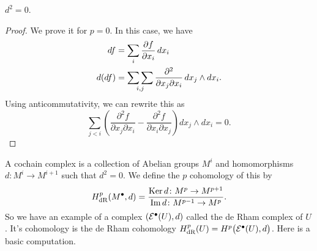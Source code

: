 \begin{lemma}
  \(d^2=0\).
\end{lemma}
\begin{proof}
  We prove it for \(p=0\). In this case, we have
  \begin{align*}
    df&=\sum_i\frac{\partial f}{\partial x_i}\mathop{}\!d x_i\\
    d(df)&=\operatorname*{\sum\sum}_{i,j}\frac{\partial^2}{\partial x_j\partial x_i}\mathop{}\!d
           x_j\wedge dx_i.
  \end{align*}
  Using anticommutativity, we can rewrite this as
  \[
    \sum_{j<i}\left(\frac{\partial^2 f}{\partial x_j\partial x_i}
    -\frac{\partial^2 f}{\partial x_i\partial x_j}\right) dx_j\wedge dx_i=0.
  \]
\end{proof}

A cochain complex is a collection of Abelian groups \(M^i\) and
homomorphisms \(d\colon M^i\to M^{i+1}\) such that \(d^2=0\). We define the
\(p\) cohomology of this by
\[
  H^p_{\mathrm{dR}}(M^\bullet,d)=\frac{\operatorname{Ker} d\colon M^p\to M^{p+1}}{\operatorname{Im} d\colon
    M^{p-1}\to M^p}.
\]
So we have an example of a complex \((\mathcal{E}^\bullet(U),d)\) called the de
Rham complex of \(U\). It's cohomology is the de Rham cohomology
\(H_{\mathrm{dR}}^p(U)=H^p\bigl(\mathcal{E}^\bullet(U),d\bigr)\). Here is a basic
computation.

